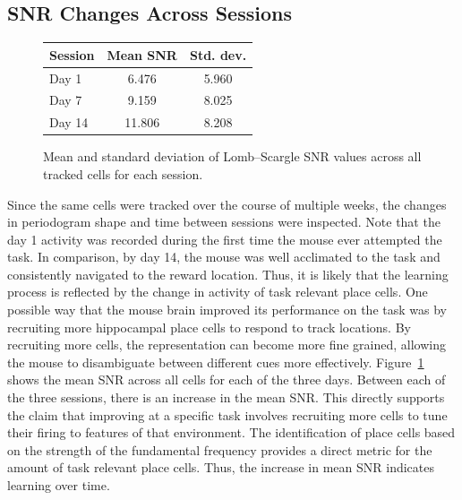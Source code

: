 \documentclass[preprint]{aastex701}
\begin{document}
\subsection{SNR Changes Across Sessions}

\begin{figure}[ht!]
\centering
\setlength{\tabcolsep}{10pt}
\renewcommand{\arraystretch}{1.25}
\begin{tabular}{lcc}
\hline
\textbf{Session} & \textbf{Mean SNR} & \textbf{Std. dev.} \\
\hline
Day 1  & 6.476 & 5.960 \\
Day 7  & 9.159 & 8.025 \\
Day 14 & 11.806 & 8.208 \\
\hline
\end{tabular}
\caption{ Mean and standard deviation of Lomb--Scargle SNR values across all tracked cells for each session.}
\label{fig:snr_table}
\end{figure}


Since the same cells were tracked over the course of multiple weeks, the changes in periodogram shape and time between sessions were inspected. Note that the day 1 activity was recorded during the first time the mouse ever attempted the task. In comparison, by day 14, the mouse was well acclimated to the task and consistently navigated to the reward location. Thus, it is likely that the learning process is reflected by the change in activity of task relevant place cells. One possible way that the mouse brain improved its performance on the task was by recruiting more hippocampal place cells to respond to track locations. By recruiting more cells, the representation can become more fine grained, allowing the mouse to disambiguate between different cues more effectively. Figure~\ref{fig:snr_table} shows the mean SNR across all cells for each of the three days. Between each of the three sessions, there is an increase in the mean SNR. This directly supports the claim that improving at a specific task involves recruiting more cells to tune their firing to features of that environment. The identification of place cells based on the strength of the fundamental frequency provides a direct metric for the amount of task relevant place cells. Thus, the increase in mean SNR indicates learning over time. 
\end{document}
